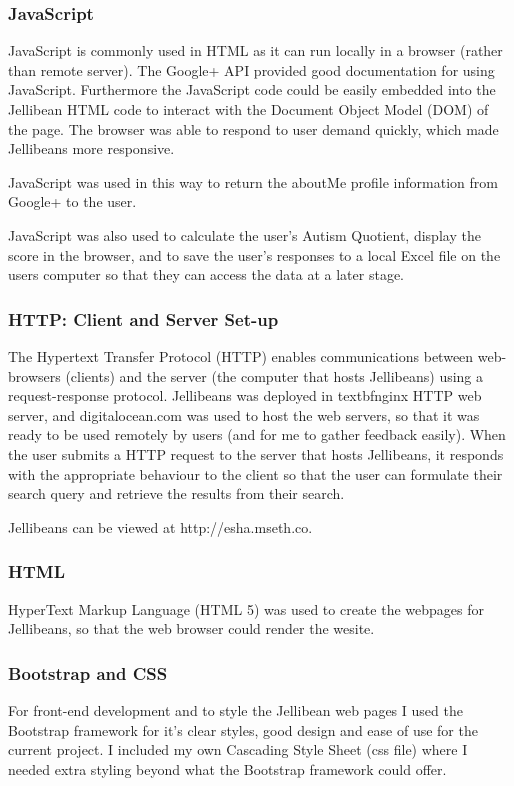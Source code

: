 \documentclass[a4paper, 11pt]{article}
\begin{document}
\subsubsection{JavaScript}

JavaScript is commonly used in HTML as it can run locally in a browser (rather than remote server). The Google+ API provided good documentation for using JavaScript. Furthermore the JavaScript code could be easily embedded into the Jellibean HTML code to interact with the Document Object Model (DOM) of the page. The browser was able to respond to user demand quickly, which made Jellibeans more responsive.

\vspace{5mm}
JavaScript was used in this way to return the aboutMe profile information from Google+ to the user.

\vspace{5mm}
JavaScript was also used to calculate the user's Autism Quotient, display the score in the browser, and to save the user's responses to a local Excel file on the users computer so that they can access the data at a later stage.

\subsubsection{HTTP: Client and Server Set-up}
The Hypertext Transfer Protocol (HTTP) enables communications between web-browsers (clients) and the server (the computer that hosts Jellibeans) using a request-response protocol. Jellibeans was deployed in textbf{nginx} HTTP web server, and digitalocean.com was used to host the web servers, so that it was ready to be used remotely by users (and for me to gather feedback easily). When the user submits a HTTP request to the server that hosts Jellibeans, it responds with the appropriate behaviour to the client so that the user can formulate their search query and retrieve the results from their search. 

\vspace{5mm}
Jellibeans can be viewed at http://esha.mseth.co.

\subsubsection{HTML}
HyperText Markup Language (HTML 5) was used to create the webpages for Jellibeans, so that the web browser could render the wesite.


\subsubsection{Bootstrap and CSS}\label{boostrap}
For front-end development and to style the Jellibean web pages I used the Bootstrap framework \cite{bootstrap} for it's clear styles, good design and ease of use for the current project. I included my own Cascading Style Sheet (css file) where I needed extra styling beyond what the Bootstrap framework could offer. 
\end{document}
